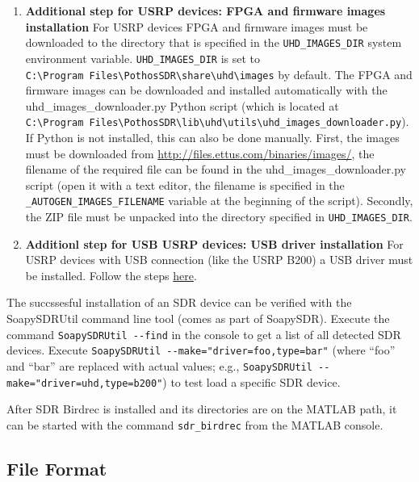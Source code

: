 \documentclass[10pt]{article}
\begin{document}
\begin{enumerate}
\def\labelenumi{\arabic{enumi}.}
\setcounter{enumi}{4}
\item
  \textbf{Additional step for USRP devices: FPGA and firmware images
  installation} For USRP devices FPGA and firmware images must be
  downloaded to the directory that is specified in the
  \texttt{UHD\_IMAGES\_DIR} system environment variable.
  \texttt{UHD\_IMAGES\_DIR} is set to
  \texttt{C:\textbackslash{}Program\ Files\textbackslash{}PothosSDR\textbackslash{}share\textbackslash{}uhd\textbackslash{}images}
  by default. The FPGA and firmware images can be downloaded and
  installed automatically with the uhd\_images\_downloader.py Python
  script (which is located at
  \texttt{C:\textbackslash{}Program\ Files\textbackslash{}PothosSDR\textbackslash{}lib\textbackslash{}uhd\textbackslash{}utils\textbackslash{}uhd\_images\_downloader.py}).
  If Python is not installed, this can also be done manually. First, the
  images must be downloaded from
  \url{http://files.ettus.com/binaries/images/}, the filename of the
  required file can be found in the uhd\_images\_downloader.py script
  (open it with a text editor, the filename is specified in the
  \texttt{\_AUTOGEN\_IMAGES\_FILENAME} variable at the beginning of the
  script). Secondly, the ZIP file must be unpacked into the directory
  specified in \texttt{UHD\_IMAGES\_DIR}.
\item
  \textbf{Additionl step for USB USRP devices: USB driver installation}
  For USRP devices with USB connection (like the USRP B200) a USB driver
  must be installed. Follow the steps
  \href{http://files.ettus.com/manual/page_transport.html\#transport_usb_installwin}{here}.
\end{enumerate}

The succssesful installation of an SDR device can be verified with the
SoapySDRUtil command line tool (comes as part of SoapySDR). Execute the
command \texttt{SoapySDRUtil\ -\/-find} in the console to get a list of
all detected SDR devices. Execute
\texttt{SoapySDRUtil\ -\/-make="driver=foo,type=bar"} (where ``foo'' and
``bar'' are replaced with actual values; e.g.,
\texttt{SoapySDRUtil\ -\/-make="driver=uhd,type=b200"}) to test load a
specific SDR device.

After SDR Birdrec is installed and its directories are on the MATLAB
path, it can be started with the command \texttt{sdr\_birdrec} from the
MATLAB console.

\subsection{File Format}\label{file-format}
\end{document}
